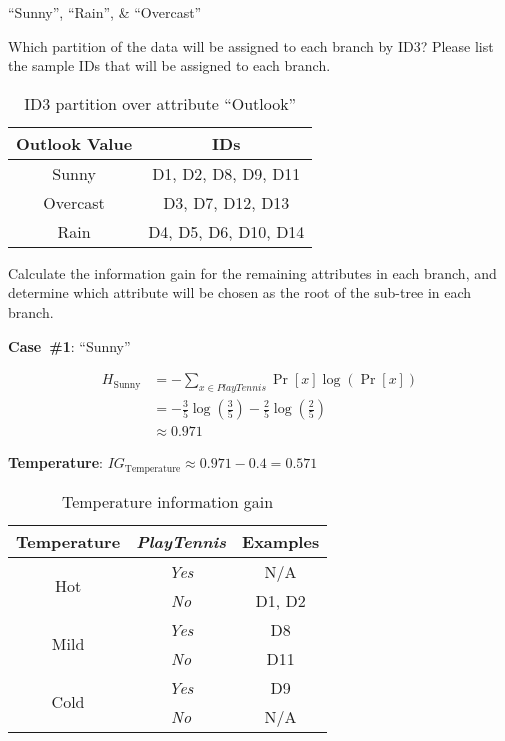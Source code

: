 ``Sunny'', ``Rain'', \& ``Overcast''

\begin{subproblem}
  Which partition of the data will be assigned to each branch by ID3? Please list the sample IDs that will be assigned to each branch.
\end{subproblem}

\begin{table}[h]
  \centering
  \caption{ID3 partition over attribute ``Outlook''}\label{tab:P02:Partition}
  \begin{tabular}{|c|c|}
    \hline
    \textbf{Outlook Value} & \textbf{IDs} \\\hline
    Sunny    & D1, D2, D8, D9, D11 \\\hline
    Overcast & D3, D7, D12, D13 \\\hline
    Rain     & D4, D5, D6, D10, D14 \\\hline
  \end{tabular}
\end{table}

\begin{subproblem}
  Calculate the information gain for the remaining attributes in each branch, and determine which attribute will be chosen as the root of the sub-tree in each branch.
\end{subproblem}

\noindent
{\large \textbf{Case~\#1}: ``Sunny''}

\begin{align*}
  H_{\text{Sunny}} &= -\sum_{x\in PlayTennis} \Pr[x] \log \left(\Pr[x]\right) \\
                   &= - \frac{3}{5} \log\left(\frac{3}{5}\right) - \frac{2}{5} \log\left(\frac{2}{5}\right) \\
                   &\approx 0.971
\end{align*}

\noindent
\textbf{Temperature}: $IG_{\text{Temperature}} \approx 0.971 - 0.4 = \boxed{0.571}$

  \begin{table}[h]
    \centering
    \caption{Temperature information gain}
    \begin{tabular}{c|c|c}
      \hline
      Temperature  & \textit{PlayTennis} & Examples \\\hline\hline
      \multirow{2}{*}{Hot}  & \textit{Yes} & N/A \\
                            & \textit{No}  & D1, D2\\\hline
      \multirow{2}{*}{Mild} & \textit{Yes} & D8 \\
                            & \textit{No}  & D11 \\\hline
      \multirow{2}{*}{Cold} & \textit{Yes} & D9 \\
                            & \textit{No}  & N/A \\\hline
    \end{tabular}
  \end{table}

